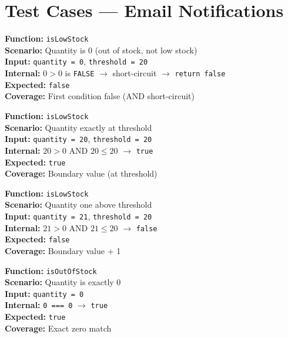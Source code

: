 \documentclass[12pt,a4paper]{report}
\newcommand{\pone}{\textbf{\color{p1red}P1}}
\begin{document}
\section{Test Cases --- Email Notifications}

\begin{tcolorbox}[criticalbox, title={EMAIL-001 \hfill \pone\ --- Out of Stock Not Low Stock}]
\textbf{Function:} \texttt{isLowStock} \\
\textbf{Scenario:} Quantity is 0 (out of stock, not low stock) \\
\textbf{Input:} \texttt{quantity = 0}, \texttt{threshold = 20} \\
\textbf{Internal:} $0 > 0$ is \texttt{FALSE} $\to$ short-circuit $\to$ \texttt{return false} \\
\textbf{Expected:} \texttt{false} \\
\textbf{Coverage:} First condition false (AND short-circuit)
\end{tcolorbox}

\begin{tcolorbox}[testbox, title={EMAIL-002 \hfill \pone\ --- At Threshold Boundary}]
\textbf{Function:} \texttt{isLowStock} \\
\textbf{Scenario:} Quantity exactly at threshold \\
\textbf{Input:} \texttt{quantity = 20}, \texttt{threshold = 20} \\
\textbf{Internal:} $20 > 0$ AND $20 \leq 20$ $\to$ \texttt{true} \\
\textbf{Expected:} \texttt{true} \\
\textbf{Coverage:} Boundary value (at threshold)
\end{tcolorbox}

\begin{tcolorbox}[testbox, title={EMAIL-003 \hfill \pone\ --- Above Threshold}]
\textbf{Function:} \texttt{isLowStock} \\
\textbf{Scenario:} Quantity one above threshold \\
\textbf{Input:} \texttt{quantity = 21}, \texttt{threshold = 20} \\
\textbf{Internal:} $21 > 0$ AND $21 \leq 20$ $\to$ \texttt{false} \\
\textbf{Expected:} \texttt{false} \\
\textbf{Coverage:} Boundary value + 1
\end{tcolorbox}

\begin{tcolorbox}[testbox, title={EMAIL-007 \hfill \pone}]
\textbf{Function:} \texttt{isOutOfStock} \\
\textbf{Scenario:} Quantity is exactly 0 \\
\textbf{Input:} \texttt{quantity = 0} \\
\textbf{Internal:} \texttt{0 === 0} $\to$ \texttt{true} \\
\textbf{Expected:} \texttt{true} \\
\textbf{Coverage:} Exact zero match
\end{tcolorbox}
\end{document}
